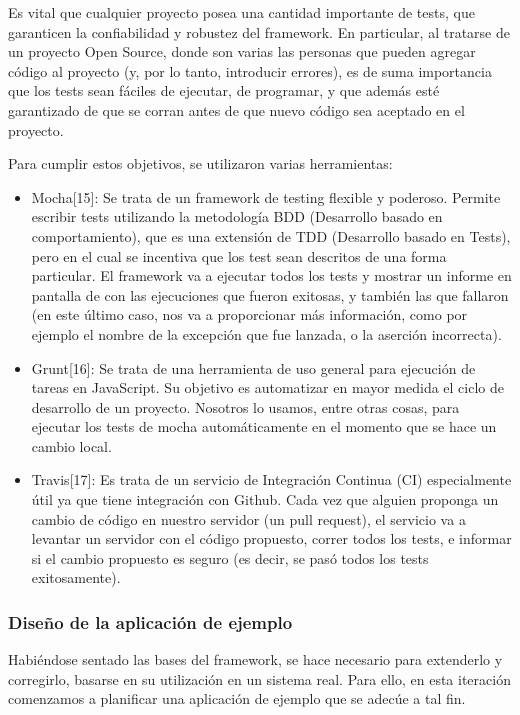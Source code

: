 \documentclass[doc,helv,longtable]{article}
\begin{document}
Es vital que cualquier proyecto posea una cantidad importante de tests, que garanticen la confiabilidad y robustez del framework. En particular, al tratarse de un proyecto Open Source, donde son varias las personas que pueden agregar código al proyecto (y, por lo tanto, introducir errores), es de suma importancia que los tests sean fáciles de ejecutar, de programar, y que además esté garantizado de que se corran antes de que nuevo código sea aceptado en el proyecto.

Para cumplir estos objetivos, se utilizaron varias herramientas:
\begin{itemize}
\item  Mocha[15]: Se trata de un framework de testing flexible y poderoso. Permite escribir tests utilizando la metodología BDD (Desarrollo basado en comportamiento), que es una extensión de TDD (Desarrollo basado en Tests), pero en el cual se incentiva que los test sean descritos de una forma particular. El framework va a ejecutar todos los tests y mostrar un informe en pantalla de con las ejecuciones que fueron exitosas, y también las que fallaron (en este último caso, nos va a proporcionar más información, como por ejemplo el nombre de la excepción que fue lanzada, o la aserción incorrecta).
\item  Grunt[16]: Se trata de una herramienta de uso general para ejecución de tareas en JavaScript. Su objetivo es automatizar en mayor medida el ciclo de desarrollo de un proyecto. Nosotros lo usamos, entre otras cosas, para ejecutar los tests de mocha automáticamente en el momento que se hace un cambio local.
\item  Travis[17]: Es trata de un servicio de Integración Continua (CI) especialmente útil ya que tiene integración con Github. Cada vez que alguien proponga un cambio de código en nuestro servidor (un pull request), el servicio va a levantar un servidor con el código propuesto, correr todos los tests, e informar si el cambio propuesto es seguro (es decir, se pasó todos los tests exitosamente).  

\end{itemize}
\subsubsection{Diseño de la aplicación de ejemplo}


Habiéndose sentado las bases del framework, se hace necesario para extenderlo y corregirlo, basarse en su utilización en un sistema real. Para ello, en esta iteración comenzamos a planificar una aplicación de ejemplo que se adecúe a tal fin.
\end{document}
